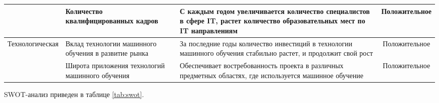 \documentclass[../main]{subfiles}
\begin{document}
\begin{ltwrap}{2mm}{1}{\footnotesize}
\begin{longtable}[H]{|C{.2\x}|M{.3\x}|M{.3\x}|C{.2\x}|}
        & Количество квалифицированных кадров
        & С каждым годом увеличивается количество специалистов в сфере IT, растет количество образовательных мест по IT направлениям
        & Положительное\\\hline
        Технологическая
        & Вклад технологии машинного обучения в развитие рынка
        & За последние годы количество инвестиций в технологии машинного обучения стабильно растет, и продолжит свой рост
        & Положительное\\\hline
        & Широта приложения технологий машинного обучения
        & Обеспечивает востребованность проекта в различных предметных областях, где используется машинное обучение
        & Положительное\\\hline
    \end{longtable}
\end{ltwrap}

SWOT-анализ приведен в таблице \ref{tab:swot}.
\end{document}
